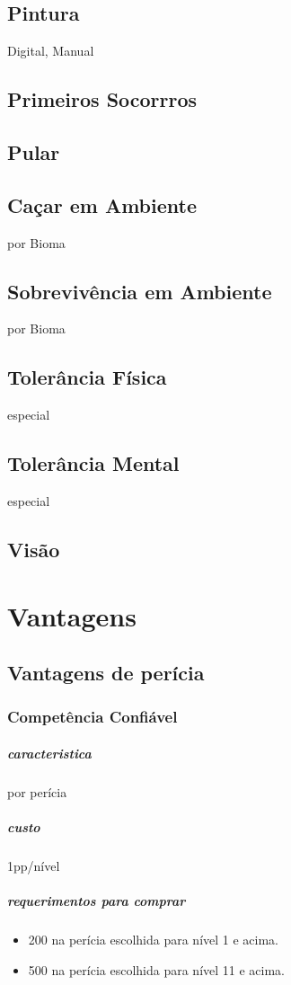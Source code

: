 \section{Pintura} Digital, Manual
\section{Primeiros Socorrros}
\section{Pular}
\section{Caçar em Ambiente} por Bioma
\section{Sobrevivência em Ambiente} por Bioma
\section{Tolerância Física} especial
\section{Tolerância Mental} especial
\section{Visão}
%
%
%
%
%
\chapter{Vantagens}
%
%
\section{Vantagens de perícia}
%
%
\subsection{Competência Confiável}
\paragraph{caracteristica} por perícia
\paragraph{custo} 1pp/nível
\paragraph{requerimentos para comprar}
\begin{itemize}
  \item 200 na perícia escolhida para nível 1 e acima.
  \item 500 na perícia escolhida para nível 11 e acima.
\end{itemize}
